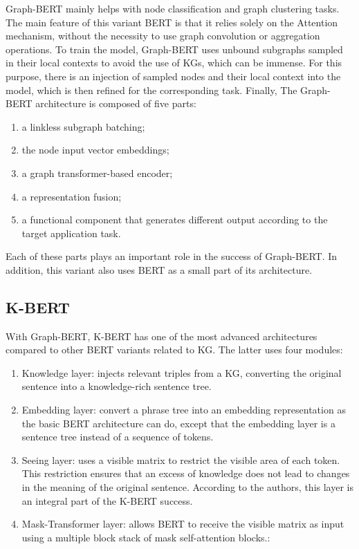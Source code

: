 Graph-BERT mainly helps with node classification and graph clustering tasks. The
main feature of this variant BERT is that it relies solely on the Attention
mechanism, without the necessity to use graph convolution or aggregation
operations. To train the model, Graph-BERT uses unbound subgraphs sampled in
their local contexts to avoid the use of KGs, which can be immense. For this
purpose, there is an injection of sampled nodes and their local context into the
model, which is then refined for the corresponding task. Finally, The
Graph-BERT architecture is composed of five parts:
\begin{multicols}{2}
\begin{enumerate}
\item a linkless subgraph batching;
\item the node input vector embeddings;
\item a graph transformer-based encoder;
\item a representation fusion;
\item a functional component that generates different output according to the
  target application task.
\end{enumerate}
\end{multicols}

\noindent Each of these parts plays an important role in the success of
Graph-BERT. In addition, this variant also uses BERT as a small part of its
architecture.

\subsection{K-BERT}
\label{subsec:discussion:k-bert}

With Graph-BERT, K-BERT has one of the most advanced architectures compared to
other BERT variants related to KG. The latter uses four modules:
\begin{enumerate}
\item Knowledge layer: injects relevant triples from a KG, converting the
original sentence into a knowledge-rich sentence tree.
\item Embedding layer: convert a phrase tree into an embedding representation as
the basic BERT architecture can do, except that the embedding layer is a
sentence tree instead of a sequence of tokens.
\item Seeing layer: uses a visible matrix to restrict the visible area of each
token. This restriction ensures that an excess of knowledge does not lead to
changes in the meaning of the original sentence. According to the authors, this
layer is an integral part of the K-BERT success.
\item Mask-Transformer layer: allows BERT to receive the visible matrix as input
using a multiple block stack of mask self-attention blocks.:
\end{enumerate}

